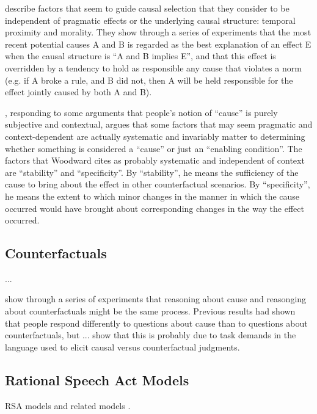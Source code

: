 \documentclass[10pt,letterpaper]{article}
\begin{document}
 describe factors that seem to guide causal selection that they consider to be independent of pragmatic effects or the underlying causal structure: temporal proximity and morality. They show through a series of experiments that the most recent potential causes A and B is regarded as the best explanation of an effect E when the causal structure is ``A and B implies E'', and that this effect is overridden by a tendency to hold as responsible any cause that violates a norm (e.g. if A broke a rule, and B did not, then A will be held responsible for the effect jointly caused by both A and B).

, responding to some arguments that people's notion of ``cause'' is purely subjective and contextual, argues that some factors that may seem pragmatic and context-dependent are actually systematic and invariably matter to determining whether something is considered a ``cause'' or just an ``enabling condition''.
The factors that Woodward cites as probably systematic and independent of context are ``stability'' and ``specificity''.
By ``stability'', he means the sufficiency of the cause to bring about the effect in other counterfactual scenarios.
By ``specificity'', he means the extent to which minor changes in the manner in which the cause occurred would have brought about corresponding changes in the way the effect occurred.

\subsection{Counterfactuals}

 ...


 show through a series of experiments that reasoning about cause and reasonging about counterfactuals might be the same process. Previous results had shown that people respond differently to questions about cause than to questions about counterfactuals, but ... show that this is probably due to task demands in the language used to elicit causal versus counterfactual judgments.

\subsection{Rational Speech Act Models}

RSA models \cite{FrankGoodman2012, GoodmanStuhlmuller2013} and related models \cite{Franke2011, Russell2012}.



\setlength{\bibleftmargin}{.125in}
\setlength{\bibindent}{-\bibleftmargin}


\end{document}
